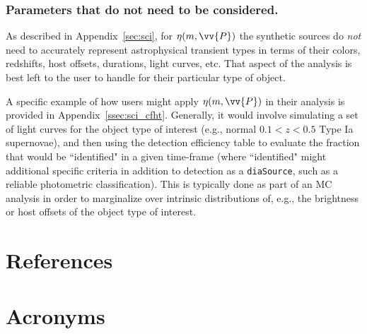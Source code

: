 \documentclass[DM,authoryear,toc]{lsstdoc}
\begin{document}
\subsubsection{Parameters that do not need to be considered.}\label{sssec:dedp_pars_no}

As described in Appendix~\ref{sec:sci}, for $\eta(m,\vv{P})$ the synthetic sources do {\it not} need to accurately represent astrophysical transient types in terms of their colors, redshifts, host offsets, durations, light curves, etc.
That aspect of the analysis is best left to the user to handle for their particular type of object.

A specific example of how users might apply $\eta(m,\vv{P})$ in their analysis is provided in Appendix~\ref{ssec:sci_cfht}.
Generally, it would involve simulating a set of light curves for the object type of interest (e.g., normal $0.1<z<0.5$ Type Ia supernovae), and then using the detection efficiency table to evaluate the fraction that would be ``identified" in a given time-frame (where ``identified" might additional specific criteria in addition to detection as a {\tt diaSource}, such as a reliable photometric classification).
This is typically done as part of an MC analysis in order to marginalize over intrinsic distributions of, e.g., the brightness or host offsets of the object type of interest.








\appendix
\section{References} \label{sec:bib}
\renewcommand{\refname}{} %


\section{Acronyms} \label{sec:acronyms}



\clearpage


\clearpage


\clearpage


\clearpage


\clearpage

\end{document}
